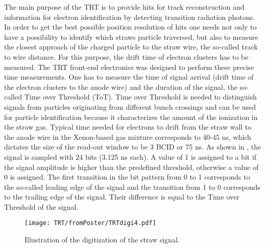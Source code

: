 The main purpose of the TRT is to provide hits for track reconstruction and information for electron identification by detecting transition radiation photons.
In order to get the best possible position resolution of hits one needs not only to have a possibility to identify which straws particle traversed,
but also to measure the closest approach of the charged particle to the straw wire, the so-called track to wire distance. 
For this purpose, the drift time of electron clusters has to be measured.
The TRT front-end electronics was designed to perform these precise time measurements.
One has to measure the time of signal arrival (drift time of the electron clusters to the anode wire) and the duration of the signal, the so-called Time over Threshold (ToT).
Time over Threshold is needed to distinguish signals from particles originating from different bunch crossings 
and can be used for particle identification because it characterizes the amount of the ionization in the straw gas.
Typical time needed for electrons to drift from the straw wall to the anode wire in the Xenon-based gas mixture corresponds to 40-45 ns, which dictates the size of the read-out window to be 
3 BCID or 75 ns. As shown in , the signal is sampled with 24 bits (3.125 ns each). 
A value of 1 is assigned to a bit if the signal amplitude is higher than the predefined threshold, 
otherwise a value of 0 is assigned. The first transition in the bit pattern from 0 to 1 corresponds to the so-called leading edge of the signal and the transition from 1 to 0 
corresponds to the trailing edge of the signal. Their difference is equal to the Time over Threshold of the signal. 

\begin{figure}[h]
\begin{center}
 \texttt{[image: TRT/fromPoster/TRTdigi4.pdf]}
\caption{Illustration of the digitization of the straw signal.}
\label{fig:pulseDigitization}
\end{center}
\end{figure}


